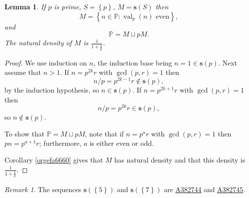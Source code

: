 \documentclass[12pt]{article}
\theoremstyle{definition}
\theoremstyle{remark}
\newtheorem{remark}{Remark}
\theoremstyle{plain}
\newtheorem{lemma}{Lemma}
\newcommand{\set}[1]{\left\{{#1}\right\}}
\newcommand\setsuchas[2]{\left\{{#1}:{#2}\right\}}
\newcommand{\NNp}{{\mathbb{P}}}
\newcommand{\val}{\operatorname{val}}
\newcommand{\ssift}[1]{\mathbf{s}({#1})}
\newcommand{\seqnum}[1]{\href{https://oeis.org/#1}{\textrm \underline{#1}}}
\begin{document}
\begin{lemma}
If \(p\) is prime, \(S=\set{p}\), \(M=\ssift{S}\) then
\[M = \setsuchas{n \in \NNp}{\val_{p}(n) \text{ even}},\]
and
\[\NNp = M \sqcup pM.\]
The natural density of \(M\) is
\(\frac{1}{1+ \frac{1}{p}}\).
\label{orgdad3ece}
\end{lemma}
\begin{proof}
We use induction on \(n\), the induction base being \(n=1 \in\ssift{p}\). Next assume that \(n>1\).
If \(n=p^{{2k}}r\) with \(\gcd(p,r)=1\) then
\[n/p = p^{{2k-1}}r \not \in \ssift{p},\]
by the induction hypothesis, so
\(n \in \ssift{p}\).
If \(n=p^{{2k+1}}r\) with \(\gcd(p,r)=1\) then
\[n/p = p^{{2k}}r \in \ssift{p},\]
so \(n \not \in \ssift{p}\).

To show that \(\NNp = M \sqcup pM\), note that if \(n=p^{a}r\) with \(\gcd(p,r)=1\) then \(pn = p^{a+1}r\); furthermore,
\(a\) is either even or odd.

Corollary \ref{orgefa6660} gives that \(M\) has natural density and that this density is
\(\frac{1}{1+ \frac{1}{p}}\).
\end{proof}

\begin{remark}
The sequences \(\ssift{\set{5}}\) and \(\ssift{\set{7}}\) are
\seqnum{A382744} and \seqnum{A382745}.
\end{remark}
\end{document}
